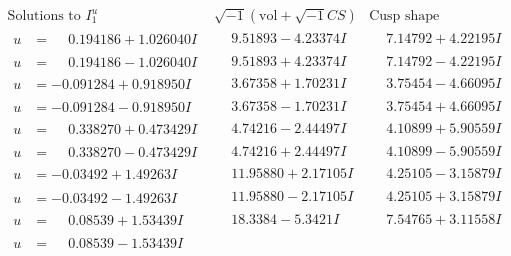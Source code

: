 \documentclass[1p]{elsarticle_modified}
\theoremstyle{definition}
\newcommand{\I}{\sqrt{-1}}
\begin{document}
$$\begin{array}{c|c|c}  
\text{Solutions to }I^u_{1}& \I (\text{vol} + \sqrt{-1}CS) & \text{Cusp shape}\\
 \hline 
\begin{aligned}
u &= \phantom{-}0.194186 + 1.026040 I\end{aligned}
 & \phantom{-}9.51893 - 4.23374 I & \phantom{-}7.14792 + 4.22195 I \\ \hline\begin{aligned}
u &= \phantom{-}0.194186 - 1.026040 I\end{aligned}
 & \phantom{-}9.51893 + 4.23374 I & \phantom{-}7.14792 - 4.22195 I \\ \hline\begin{aligned}
u &= -0.091284 + 0.918950 I\end{aligned}
 & \phantom{-}3.67358 + 1.70231 I & \phantom{-}3.75454 - 4.66095 I \\ \hline\begin{aligned}
u &= -0.091284 - 0.918950 I\end{aligned}
 & \phantom{-}3.67358 - 1.70231 I & \phantom{-}3.75454 + 4.66095 I \\ \hline\begin{aligned}
u &= \phantom{-}0.338270 + 0.473429 I\end{aligned}
 & \phantom{-}4.74216 - 2.44497 I & \phantom{-}4.10899 + 5.90559 I \\ \hline\begin{aligned}
u &= \phantom{-}0.338270 - 0.473429 I\end{aligned}
 & \phantom{-}4.74216 + 2.44497 I & \phantom{-}4.10899 - 5.90559 I \\ \hline\begin{aligned}
u &= -0.03492 + 1.49263 I\end{aligned}
 & \phantom{-}11.95880 + 2.17105 I & \phantom{-}4.25105 - 3.15879 I \\ \hline\begin{aligned}
u &= -0.03492 - 1.49263 I\end{aligned}
 & \phantom{-}11.95880 - 2.17105 I & \phantom{-}4.25105 + 3.15879 I \\ \hline\begin{aligned}
u &= \phantom{-}0.08539 + 1.53439 I\end{aligned}
 & \phantom{-}18.3384 - 5.3421 I & \phantom{-}7.54765 + 3.11558 I \\ \hline\begin{aligned}
u &= \phantom{-}0.08539 - 1.53439 I\end{aligned}

\end{array}$$
\end{document}
